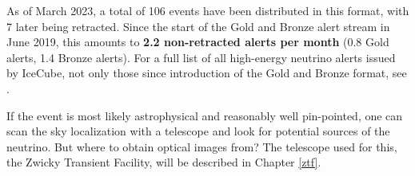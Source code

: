 As of March 2023, a total of 106 events have been distributed in this format, with 7 later being retracted. Since the start of the Gold and Bronze alert stream in June 2019, this amounts to \textbf{2.2 non-retracted alerts per month} (0.8 Gold alerts, 1.4 Bronze alerts). For a full list of all high-energy neutrino alerts issued by IceCube, not only those since introduction of the Gold and Bronze format, see \cite{Abbasi2023}.

If the event is most likely astrophysical and reasonably well pin-pointed, one can scan the sky localization with a telescope and look for potential sources of the neutrino. But where to obtain optical images from? The telescope used for this, the Zwicky Transient Facility, will be described in Chapter \ref{ztf}.




